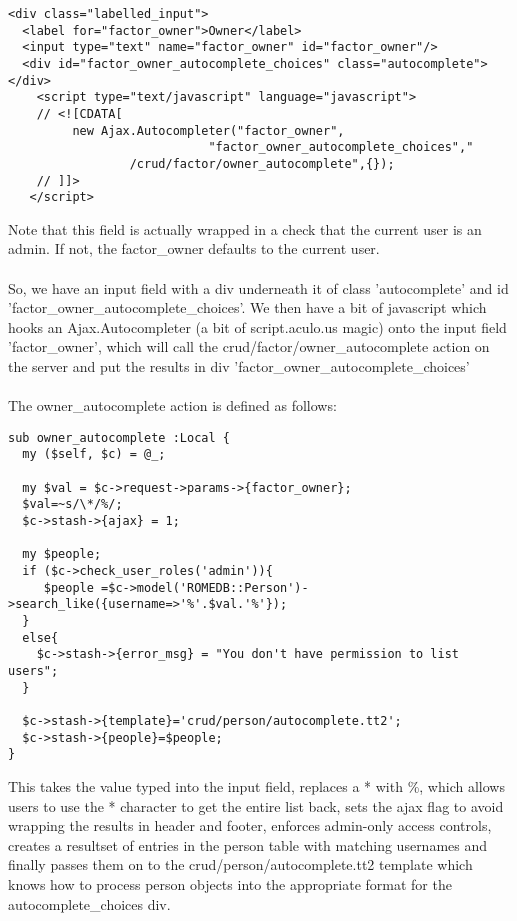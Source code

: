 \begin{verbatim}
<div class="labelled_input">
  <label for="factor_owner">Owner</label>
  <input type="text" name="factor_owner" id="factor_owner"/>
  <div id="factor_owner_autocomplete_choices" class="autocomplete"></div>
    <script type="text/javascript" language="javascript">
    // <![CDATA[
         new Ajax.Autocompleter("factor_owner",
	                        "factor_owner_autocomplete_choices","
				 /crud/factor/owner_autocomplete",{});
    // ]]>
   </script>
\end{verbatim}

Note that this field is actually wrapped in a check that the current user is an admin. If not, the factor\_owner defaults to the current user.

\paragraph*{}
So, we have an input field with a div underneath it of class 'autocomplete' and id 'factor\_owner\_autocomplete\_choices'. We then have a bit of javascript which hooks an Ajax.Autocompleter (a bit of script.aculo.us magic) onto the input field 'factor\_owner', which will call the crud/factor/owner\_autocomplete action on the server and put the results in div 'factor\_owner\_autocomplete\_choices' 

\paragraph*{}
The owner\_autocomplete action is defined as follows:

\begin{verbatim}
sub owner_autocomplete :Local {
  my ($self, $c) = @_;
  
  my $val = $c->request->params->{factor_owner};
  $val=~s/\*/%/;
  $c->stash->{ajax} = 1;

  my $people;
  if ($c->check_user_roles('admin')){
     $people =$c->model('ROMEDB::Person')->search_like({username=>'%'.$val.'%'});
  }
  else{
    $c->stash->{error_msg} = "You don't have permission to list users";
  }

  $c->stash->{template}='crud/person/autocomplete.tt2';
  $c->stash->{people}=$people;
}

\end{verbatim}


This takes the value typed into the input field, replaces a * with \%, which allows users to use the * character to get the entire list back, sets the ajax flag to avoid wrapping the results in header and footer, enforces admin-only access controls, creates a resultset of entries in the person table with matching usernames and finally passes them on to the crud/person/autocomplete.tt2 template which knows how to process person objects into the appropriate format for the autocomplete\_choices div.

